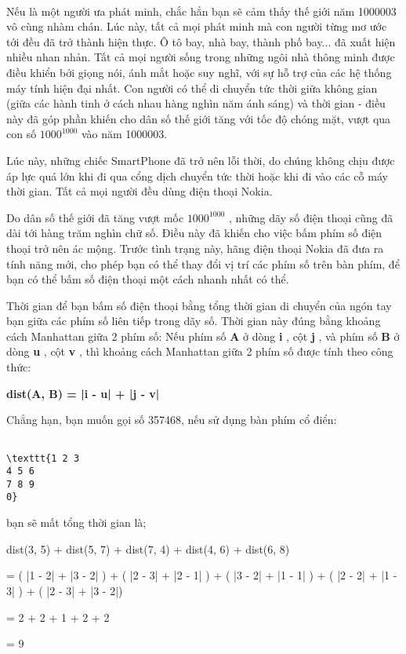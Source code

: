  

Nếu là một người ưa phát minh, chắc hẳn bạn sẽ cảm thấy thế giới năm 1000003 vô cùng nhàm chán. Lúc này, tất cả mọi phát minh mà con người từng mơ ước tới đều đã trở thành hiện thực. Ô tô bay, nhà bay, thành phố bay... đã xuất hiện nhiều nhan nhản. Tất cả mọi người sống trong những ngôi nhà thông minh được điều khiển bởi giọng nói, ánh mắt hoặc suy nghĩ, với sự hỗ trợ của các hệ thống máy tính hiện đại nhất. Con người có thể di chuyển tức thời giữa không gian (giữa các hành tinh ở cách nhau hàng nghìn năm ánh sáng) và thời gian - điều này đã góp phần khiến cho dân số thế giới tăng với tốc độ chóng mặt, vượt qua con số $1000^{1000}$ vào năm 1000003.

Lúc này, những chiếc SmartPhone đã trở nên lỗi thời, do chúng không chịu được áp lực quá lớn khi đi qua cổng dịch chuyển tức thời hoặc khi đi vào các cỗ máy thời gian. Tất cả mọi người đều dùng điện thoại Nokia.

Do dân số thế giới đã tăng vượt mốc $1000^{1000}$ , những dãy số điện thoại cũng đã dài tới hàng trăm nghìn chữ số. Điều này đã khiến cho việc bấm phím số điện thoại trở nên ác mộng. Trước tình trạng này, hãng điện thoại Nokia đã đưa ra tính năng mới, cho phép bạn có thể thay đổi vị trí các phím số trên bàn phím, để bạn có thể bấm số điện thoại một cách nhanh nhất có thể.

Thời gian để bạn bấm số điện thoại bằng tổng thời gian di chuyển của ngón tay bạn giữa các phím số liên tiếp trong dãy số. Thời gian này đúng bằng khoảng cách Manhattan giữa 2 phím số: Nếu phím số \textbf{ A } ở dòng \textbf{ i } , cột \textbf{ j } , và phím số \textbf{ B } ở dòng \textbf{ u } , cột \textbf{ v } , thì khoảng cách Manhattan giữa 2 phím số được tính theo công thức:

\textbf{dist(A, B) = |i - u| + |j - v| }

Chẳng hạn, bạn muốn gọi số 357468, nếu sử dụng bàn phím cổ điển:
\begin{verbatim}

\texttt{1 2 3
4 5 6
7 8 9
0}\end{verbatim}

bạn sẽ mất tổng thời gian là;

dist(3, 5) + dist(5, 7) + dist(7, 4) + dist(4, 6) + dist(6, 8)

= ( |1 - 2| + |3 - 2| ) + ( |2 - 3| + |2 - 1| ) + ( |3 - 2| + |1 - 1| ) + ( |2 - 2| + |1 - 3| ) + ( |2 - 3| + |3 - 2|)

= 2 + 2 + 1 + 2 + 2

= 9

